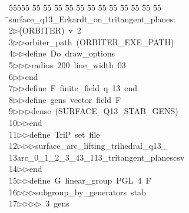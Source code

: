 %
%
\begin{tabbing}
55555 \= 55 \= 55 \= 55 \= 55 \= 55 \= 55 \= 55 \= 55 \= 55 \= 55 \= 55 \= 55 \= \>surface\_q13\_Eckardt\_on\_tritangent\_planes:\\[0pt]
2\>$\triangleright$\>(ORBITER)\ v\ 2\ \\[0pt]
3\>$\triangleright$\>$\triangleright$\>orbiter\_path\ (ORBITER\_EXE\_PATH)\ \\[0pt]
4\>$\triangleright$\>$\triangleright$\>define\ Do\ draw\_options\ \\[0pt]
5\>$\triangleright$\>$\triangleright$\>$\triangleright$\>radius\ 200\ line\_width\ 03\ \\[0pt]
6\>$\triangleright$\>$\triangleright$\>end\ \\[0pt]
7\>$\triangleright$\>$\triangleright$\>define\ F\ finite\_field\ q\ 13\ end\ \\[0pt]
8\>$\triangleright$\>$\triangleright$\>define\ gens\ vector\ field\ F\ \\[0pt]
9\>$\triangleright$\>$\triangleright$\>$\triangleright$\>dense\ (SURFACE\_Q13\_STAB\_GENS)\ \\[0pt]
10\>$\triangleright$\>$\triangleright$\>end\ \\[0pt]
11\>$\triangleright$\>$\triangleright$\>define\ TriP\ set\ file\ \\[0pt]
12\>$\triangleright$\>$\triangleright$\>$\triangleright$\>surface\_arc\_lifting\_trihedral\_q13\_\\[0pt]
13\>arc\_0\_1\_2\_3\_43\_113\_tritangent\_planescsv\ \\[0pt]
14\>$\triangleright$\>$\triangleright$\>end\ \\[0pt]
15\>$\triangleright$\>$\triangleright$\>define\ G\ linear\_group\ PGL\ 4\ F\ \\[0pt]
16\>$\triangleright$\>$\triangleright$\>$\triangleright$\>subgroup\_by\_generators\ stab\ \\[0pt]
17\>$\triangleright$\>$\triangleright$\>$\triangleright$\>$\triangleright$\ 3\ gens\ \\[0pt]

\end{tabbing}
